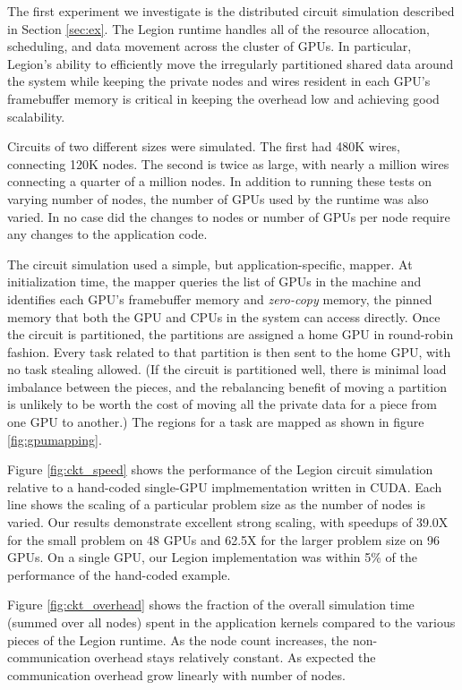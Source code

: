 The first experiment we investigate is the distributed circuit simulation described in 
Section \ref{sec:ex}.  The Legion runtime handles all of the resource allocation, 
scheduling, and data movement across the cluster of GPUs.  In particular,  
Legion's ability to efficiently move the irregularly partitioned
shared data around the system while keeping the private nodes and wires resident in
each GPU's framebuffer memory is critical in keeping the overhead low and achieving 
good scalability.

Circuits of two different sizes were simulated.  The first had 480K wires, connecting
120K nodes.  The second is twice as large, with nearly a million wires connecting a
quarter of a million nodes.  In addition to running these tests on varying number of
nodes, the number of GPUs used by the runtime was also varied.  In no case did the 
changes to nodes or number of GPUs per node require any changes to the application code.

The circuit simulation used a simple, but application-specific, mapper.  At initialization
time, the mapper queries the list of GPUs in the machine and identifies each GPU's
framebuffer memory and {\em zero-copy} memory, the pinned memory that both the GPU and
CPUs in the system can access directly.  Once the circuit is partitioned, the partitions
are assigned a home GPU in round-robin fashion.  Every task related to that partition is
then sent to the home GPU, with no task stealing allowed.  (If the circuit is partitioned well,
there is minimal load imbalance between the pieces, and the rebalancing benefit of 
moving a partition is unlikely to be worth the cost of moving all the 
private data for a piece from one GPU to another.)  The regions for a task are mapped as 
shown in figure \ref{fig:gpumapping}.

Figure \ref{fig:ckt_speed} shows the performance of the Legion circuit simulation relative
to a hand-coded single-GPU implmementation written in CUDA.  Each line shows the scaling of
a particular problem size as the number of nodes is varied.  Our results demonstrate
excellent strong scaling, with speedups of 39.0X for the small problem on 48 GPUs and 
62.5X for the larger problem size on 96 GPUs.  On a single GPU, our Legion implementation
was within 5\% of the performance of the hand-coded example.

Figure \ref{fig:ckt_overhead} shows the fraction of the overall simulation time (summed over
all nodes) spent in the application kernels compared to the various pieces of the Legion
runtime.  As the node count increases, the non-communication overhead stays relatively constant.
As expected the communication overhead grow linearly with number of nodes.

